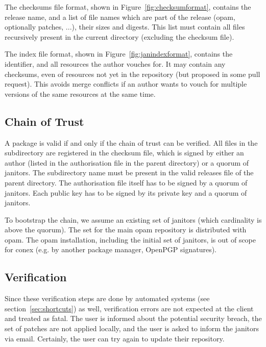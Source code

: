 \documentclass[nocopyrightspace]{sigplanconf}
\newcommand{\TODO}[1]{\textbf{[TODO: #1]}}
\begin{document}
The checksums file format, shown in Figure~\ref{fig:checksumformat}, contains the release name, and a list of file names which are part of the release (opam, optionally patches, ...), their sizes and digests.
This list must contain all files recursively present in the current directory (excluding the checksum file).

The index file format, shown in Figure~\ref{fig:janindexformat}, contains the identifier, and all resources the author vouches for.
It may contain any checksums, even of resources not yet in the repository (but proposed in some pull request).
This avoids merge conflicts if an author wants to vouch for multiple versions of the same resources at the same time.

\subsection{Chain of Trust}
A package is valid if and only if the chain of trust can be verified.
All files in the subdirectory are registered in the checksum file, which is signed by either an author (listed in the authorisation file in the parent directory) or a quorum of janitors.
The subdirectory name must be present in the valid releases file of the parent directory.
The authorisation file itself has to be signed by a quorum of janitors.
Each public key has to be signed by its private key and a quorum of janitors.

To bootstrap the chain, we assume an existing set of janitors (which cardinality is above the quorum).
The set for the main opam repository is distributed with opam.
The opam installation, including the initial set of janitors, is out of scope for conex (e.g. by another package manager, OpenPGP signatures).

\subsection{Verification}
Since these verification steps are done by automated systems (see section~\ref{sec:shortcuts}) as well, verification errors are not expected at the client and treated as fatal.
The user is informed about the potential security breach, the set of patches are not applied locally, and the user is asked to inform the janitors via email.
Certainly, the user can try again to update their repository.
\end{document}

